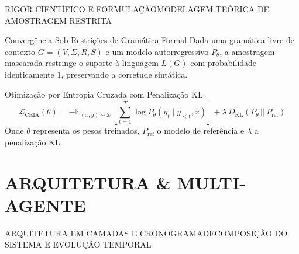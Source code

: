 \documentclass[aspectratio=169,t,xcolor=table]{beamer}
\begin{document}
\begin{frame}{RIGOR CIENTÍFICO E FORMULAÇÃO}{MODELAGEM TEÓRICA DE AMOSTRAGEM RESTRITA}
    \begin{ceiatheorem}[top=3.5pt, bottom=3.5pt]{Convergência Sob Restrições de Gramática Formal}
        Dada uma gramática livre de contexto $G = (V, \Sigma, R, S)$ e um modelo autorregressivo $P_\theta$, a amostragem mascarada restringe o suporte à linguagem $L(G)$ com probabilidade identicamente $1$, preservando a corretude sintática.
    \end{ceiatheorem}

    \begin{ceiaformula}[top=4pt, bottom=4pt]{Otimização por Entropia Cruzada com Penalização KL}
        \[
            \mathcal{L}_{\text{CEIA}}(\theta) = -\mathbb{E}_{(x, y) \sim \mathcal{D}} \left[ \sum_{t=1}^T \log P_\theta(y_t \mid y_{<t}, x) \right] + \lambda \, D_{\text{KL}}\left(P_\theta \,||\, P_{\text{ref}}\right)
        \]
        \vspace{1pt}
        {\scriptsize\color{CEIATextMuted}
        Onde $\theta$ representa os pesos treinados, $P_{\text{ref}}$ o modelo de referência e $\lambda$ a penalização KL.}
    \end{ceiaformula}
\end{frame}

\section{ARQUITETURA \& MULTI-AGENTE}

\begin{frame}{ARQUITETURA EM CAMADAS E CRONOGRAMA}{DECOMPOSIÇÃO DO SISTEMA E EVOLUÇÃO TEMPORAL}
    \vspace{0.1em}
    
    \vspace{-0.1cm}
\end{frame}
\end{document}
